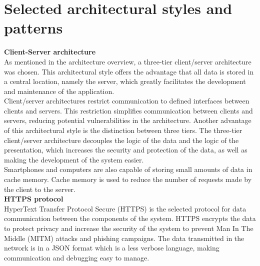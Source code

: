 \documentclass[12pt]{report}
\begin{document}
\section{Selected architectural styles and patterns}

\bigskip
\textbf{Client-Server architecture}\\
As mentioned in the architecture overview, a three-tier client/server architecture was chosen. This architectural style offers the advantage that all data is stored in a central location, namely the server, which greatly facilitates the development and maintenance of the application.\\
Client/server architectures restrict communication to defined interfaces between clients and servers. This restriction simplifies communication between clients and servers, reducing potential vulnerabilities in the architecture. Another advantage of this architectural style is the distinction between three tiers. The three-tier client/server architecture decouples the logic of the data and the logic of the presentation, which increases the security and protection of the data, as well as making the development of the system easier.\\
Smartphones and computers are also capable of storing small amounts of data in cache memory. Cache memory is used to reduce the number of requests made by the client to the server.\\

\bigskip
\noindent\textbf{HTTPS protocol}\\
HyperText Transfer Protocol Secure (HTTPS) is the selected protocol for data communication between the components of the system. HTTPS encrypts the data to protect privacy and increase the security of the system to prevent Man In The Middle (MITM) attacks and phishing campaigns.
The data transmitted in the network is in a JSON format which is a less verbose language, making communication and debugging easy to manage.\\
\end{document}
